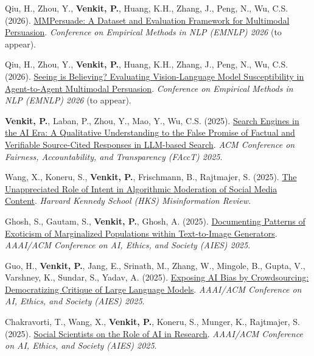 {\begin{cvitems}
  \item {Qiu, H., Zhou, Y., \textbf{Venkit, P.}, Huang, K.H., Zhang, J., Peng, N., Wu, C.S. (2026). \href{https://openreview.net/forum?id=RWPxyyjFyr}{MMPersuade: A Dataset and Evaluation Framework for Multimodal Persuasion}. \textit{Conference on Empirical Methods in NLP (EMNLP) 2026} (to appear).}
  \item {Qiu, H., Zhou, Y., \textbf{Venkit, P.}, Huang, K.H., Zhang, J., Peng, N., Wu, C.S. (2026). \href{https://arxiv.org/abs/2510.22768}{Seeing is Believing? Evaluating Vision-Language Model Susceptibility in Agent-to-Agent Multimodal Persuasion}. \textit{Conference on Empirical Methods in NLP (EMNLP) 2026} (to appear).}
  \item {\textbf{Venkit, P.}, Laban, P., Zhou, Y., Mao, Y., Wu, C.S. (2025). \href{https://dl.acm.org/doi/abs/10.1145/3715275.3732089}{Search Engines in the AI Era: A Qualitative Understanding to the False Promise of Factual and Verifiable Source-Cited Responses in LLM-based Search}. \textit{ACM Conference on Fairness, Accountability, and Transparency (FAccT) 2025}.}
  \item {Wang, X., Koneru, S., \textbf{Venkit, P.}, Frischmann, B., Rajtmajer, S. (2025). \href{https://misinforeview.hks.harvard.edu/article/the-unappreciated-role-of-intent-in-algorithmic-moderation-of-abusive-content-on-social-media/}{The Unappreciated Role of Intent in Algorithmic Moderation of Social Media Content}. \textit{Harvard Kennedy School (HKS) Misinformation Review}.}
  \item {Ghosh, S., Gautam, S., \textbf{Venkit, P.}, Ghosh, A. (2025). \href{https://ojs.aaai.org/index.php/AIES/article/view/36614}{Documenting Patterns of Exoticism of Marginalized Populations within Text-to-Image Generators}. \textit{AAAI/ACM Conference on AI, Ethics, and Society (AIES) 2025}.}
  \item {Guo, H., \textbf{Venkit, P.}, Jang, E., Srinath, M., Zhang, W., Mingole, B., Gupta, V., Varshney, K., Sundar, S., Yadav, A. (2025). \href{https://ojs.aaai.org/index.php/AIES/article/view/36620}{Exposing AI Bias by Crowdsourcing: Democratizing Critique of Large Language Models}. \textit{AAAI/ACM Conference on AI, Ethics, and Society (AIES) 2025}.}
  \item {Chakravorti, T., Wang, X., \textbf{Venkit, P.}, Koneru, S., Munger, K., Rajtmajer, S. (2025). \href{https://ojs.aaai.org/index.php/AIES/article/view/36568}{Social Scientists on the Role of AI in Research}. \textit{AAAI/ACM Conference on AI, Ethics, and Society (AIES) 2025}.}

\end{cvitems}}
